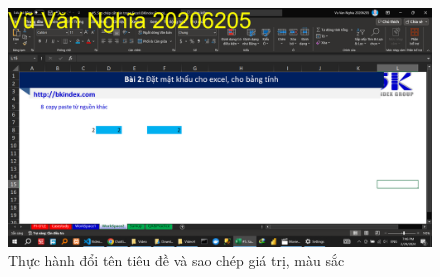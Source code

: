 \documentclass{article}
\begin{document}
\begin{figure}[h]
    \centering
    \includegraphics[scale = 0.15]{Video4/ThucHanh/1.png}
    \caption{Thực hành đổi tên tiêu đề và sao chép giá trị, màu sắc}
\end{figure}









\end{document}
